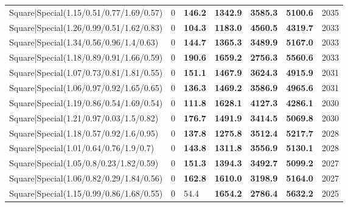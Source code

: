 \begin{tabular}{lrllllr}
 Square|Special(1.15/0.51/0.77/1.69/0.57)                      &             0   & \textbf{146.2} & \textbf{1342.9} & \textbf{3585.3} & \textbf{5100.6} &         2035 \\
 Square|Special(1.26/0.99/0.51/1.62/0.83)                      &             0   & \textbf{104.3} & \textbf{1183.0} & \textbf{4560.5} & \textbf{4319.7} &         2033 \\
 Square|Special(1.34/0.56/0.96/1.4/0.63)                       &             0   & \textbf{144.7} & \textbf{1365.3} & \textbf{3489.9} & \textbf{5167.0} &         2033 \\
 Square|Special(1.18/0.89/0.91/1.66/0.59)                      &             0   & \textbf{190.6} & \textbf{1659.2} & \textbf{2756.3} & \textbf{5560.6} &         2033 \\
 Square|Special(1.07/0.73/0.81/1.81/0.55)                      &             0   & \textbf{151.1} & \textbf{1467.9} & \textbf{3624.3} & \textbf{4915.9} &         2031 \\
 Square|Special(1.06/0.97/0.92/1.65/0.65)                      &             0   & \textbf{136.3} & \textbf{1469.2} & \textbf{3586.9} & \textbf{4965.6} &         2031 \\
 Square|Special(1.19/0.86/0.54/1.69/0.54)                      &             0   & \textbf{111.8} & \textbf{1628.1} & \textbf{4127.3} & \textbf{4286.1} &         2030 \\
 Square|Special(1.21/0.97/0.03/1.5/0.82)                       &             0   & \textbf{176.7} & \textbf{1491.9} & \textbf{3414.5} & \textbf{5069.8} &         2030 \\
 Square|Special(1.18/0.57/0.92/1.6/0.95)                       &             0   & \textbf{137.8} & \textbf{1275.8} & \textbf{3512.4} & \textbf{5217.7} &         2028 \\
 Square|Special(1.01/0.64/0.76/1.9/0.7)                        &             0   & \textbf{143.8} & \textbf{1311.8} & \textbf{3556.9} & \textbf{5130.1} &         2028 \\
 Square|Special(1.05/0.8/0.23/1.82/0.59)                       &             0   & \textbf{151.3} & \textbf{1394.3} & \textbf{3492.7} & \textbf{5099.2} &         2027 \\
 Square|Special(1.06/0.82/0.29/1.84/0.56)                      &             0   & \textbf{162.8} & \textbf{1610.0} & \textbf{3198.9} & \textbf{5164.0} &         2027 \\
 Square|Special(1.15/0.99/0.86/1.68/0.55)                      &             0   & 54.4           & \textbf{1654.2} & \textbf{2786.4} & \textbf{5632.2} &         2025 \\

\end{tabular}
